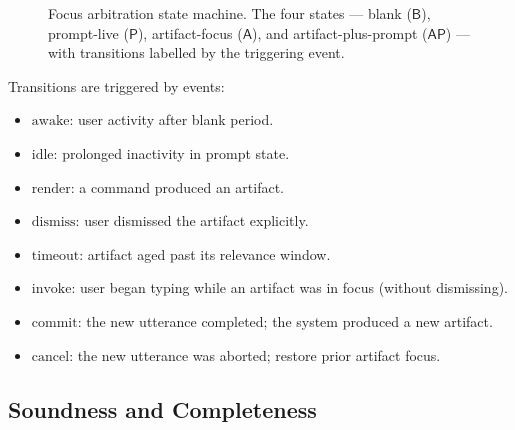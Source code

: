 \documentclass[11pt,twocolumn,a4paper]{article}
\theoremstyle{definition}
\theoremstyle{remark}
\begin{document}
\begin{figure}[t]
\centering
{}
\caption{Focus arbitration state machine. The four states --- blank ($\mathsf{B}$), prompt-live ($\mathsf{P}$), artifact-focus ($\mathsf{A}$), and artifact-plus-prompt ($\mathsf{AP}$) --- with transitions labelled by the triggering event.}
\label{fig:focus-states}
\end{figure}

Transitions are triggered by events:
\begin{itemize}
    \item $\text{awake}$: user activity after blank period.
    \item $\text{idle}$: prolonged inactivity in prompt state.
    \item $\text{render}$: a command produced an artifact.
    \item $\text{dismiss}$: user dismissed the artifact explicitly.
    \item $\text{timeout}$: artifact aged past its relevance window.
    \item $\text{invoke}$: user began typing while an artifact was in focus (without dismissing).
    \item $\text{commit}$: the new utterance completed; the system produced a new artifact.
    \item $\text{cancel}$: the new utterance was aborted; restore prior artifact focus.
\end{itemize}

\subsection{Soundness and Completeness}
\end{document}
